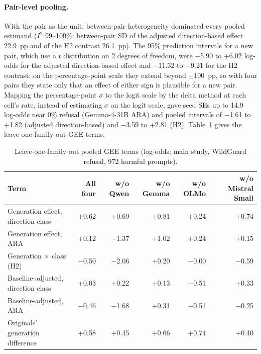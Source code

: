\paragraph{Pair-level pooling.} With the pair as the unit, between-pair
heterogeneity dominated every pooled estimand ($I^2$ 99--100\%; between-pair
SD of the adjusted direction-based effect 22.9~pp and of the H2 contrast
26.1~pp). The 95\% prediction intervals for a new pair, which use a $t$
distribution on 2 degrees of freedom, were $-$5.90 to +6.02 log-odds for the
adjusted direction-based effect and $-$11.32 to +9.21 for the H2 contrast; on
the percentage-point scale they extend beyond $\pm$100~pp, so with four pairs
they state only that an effect of either sign is plausible for a new pair.
Mapping the percentage-point $\sigma$ to the logit scale by the delta method
at each cell's rate, instead of estimating $\sigma$ on the logit scale, gave
seed SEs up to 14.9 log-odds near 0\% refusal (Gemma-4-31B ARA) and pooled
intervals of $-$1.61 to +1.82 (adjusted direction-based) and $-$3.59 to +2.81
(H2). Table~\ref{tab:lofo} gives the leave-one-family-out GEE terms.

\begin{table}[t]
\centering\footnotesize
\setlength{\tabcolsep}{3pt}
\caption{Leave-one-family-out pooled GEE terms (log-odds; main study, WildGuard refusal, 972 harmful prompts).}
\label{tab:lofo}
\begin{tabular}{@{}lrrrrr@{}}
\toprule
Term & All four & w/o Qwen & w/o Gemma & w/o OLMo & w/o Mistral Small \\
\midrule
Generation effect, direction class & +0.62 & +0.69 & +0.81 & +0.24 & +0.74 \\
Generation effect, ARA & +0.12 & $-$1.37 & +1.02 & +0.24 & +0.15 \\
Generation $\times$ class (H2) & $-$0.50 & $-$2.06 & +0.20 & $-$0.00 & $-$0.59 \\
Baseline-adjusted, direction class & +0.03 & +0.22 & +0.13 & $-$0.51 & +0.33 \\
Baseline-adjusted, ARA & $-$0.46 & $-$1.68 & +0.31 & $-$0.51 & $-$0.25 \\
Originals' generation difference & +0.58 & +0.45 & +0.66 & +0.74 & +0.40 \\
\bottomrule
\end{tabular}
\end{table}

